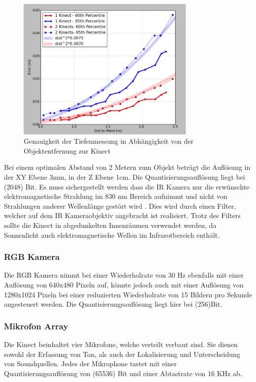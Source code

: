 \begin{figure}
  \vspace{-20pt}
  \begin{center}
        \includegraphics[height=7cm]{Res/Res_to_Dist.png}
  \end{center}
  \vspace{-20pt}
  \caption{Genauigkeit der Tiefenmessung in Abhängigkeit von der Objektentfernung zur Kinect }
  \vspace{-10pt}
\end{figure}


Bei einem optimalen Abstand von 2 Metern zum Objekt beträgt die Auflösung in der XY Ebene 3mm, in der Z Ebene 1cm.
Die Quantisierungsauflösung liegt bei  (2048) Bit.
Es muss sichergestellt werden dass die IR Kamera nur die erwünschte elektromagnetische Strahlung im 830 nm Bereich aufnimmt und nicht von Strahlungen anderer Wellenlänge gestört wird . Dies wird durch einen Filter, welcher auf dem IR Kameraobjektiv angebracht ist realisiert.
Trotz des Filters sollte die Kinect in abgedunkelten Innenräumen verwendet werden, da  Sonnenlicht auch elektromagnetische Wellen im Infrarotbereich enthält.\\

\subsubsection{RGB Kamera}

Die RGB Kamera nimmt bei einer Wiederholrate von 30 Hz ebenfalls mit einer Auflösung von 640x480 Pixeln auf, könnte jedoch auch mit einer Auflösung von 1280x1024 Pixeln bei einer reduzierten Wiederholrate von 15 Bildern pro Sekunde angesteuert werden.
Die Quantisierungsauflösung liegt hier bei  (256)Bit. \\


\subsubsection{Mikrofon Array}
Die Kinect beinhaltet vier Mikrofone, welche verteilt verbaut sind. Sie dienen sowohl der Erfassung von Ton, als auch der Lokalisierung und Unterscheidung von Soundquellen. Jedes der Mikrophone tastet mit einer Quantisierungsauflösung von  (65536) Bit und einer Abtastrate von 16 KHz ab.

